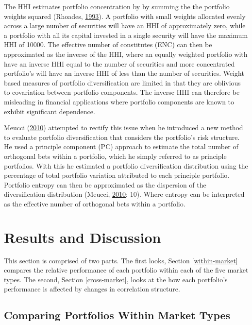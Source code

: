 \documentclass[11pt,preprint, authoryear]{elsarticle}
\numberwithin{equation}{section}
\numberwithin{figure}{section}
\numberwithin{table}{section}
\begin{document}
The HHI estimates portfolio concentration by by summing the the
portfolio weights squared (Rhoades,
\protect\hyperlink{ref-rhoades1993}{1993}). A portfolio with small
weights allocated evenly across a large number of securities will have
an HHI of approximately zero, while a portfolio with all its capital
invested in a single security will have the maximum HHI of 10000. The
effective number of constitutes (ENC) can then be approximated as the
inverse of the HHI, where an equally weighted portfolio with have an
inverse HHI equal to the number of securities and more concentrated
portfolio's will have an inverse HHI of less than the number of
securities. Weight based measures of portfolio diversification are
limited in that they are oblivious to covariation between portfolio
components. The inverse HHI can therefore be misleading in financial
applications where portfolio components are known to exhibit significant
dependence.

Meucci (\protect\hyperlink{ref-meucci2010}{2010}) attempted to rectify
this issue when he introduced a new method to evaluate portfolio
diversification that considers the portfolio's risk structure. He used a
principle component (PC) approach to estimate the total number of
orthogonal bets within a portfolio, which he simply referred to as
principle portfolios. With this he estimated a portfolio diversification
distribution using the percentage of total portfolio variation
attributed to each principle portfolio. Portfolio entropy can then be
approximated as the dispersion of the diversification distribution
(Meucci, \protect\hyperlink{ref-meucci2010}{2010}: 10). Where entropy
can be interpreted as the effective number of orthogonal bets within a
portfolio.

\hypertarget{results-and-discussion}{%
\section{\texorpdfstring{Results and Discussion
\label{reasults}}{Results and Discussion }}\label{results-and-discussion}}

This section is comprised of two parts. The first looks, Section
\ref{within-market} compares the relative performance of each portfolio
within each of the five market types. The second, Section
\ref{cross-market}, looks at the how each portfolio's performance is
affected by changes in correlation structure.

\hypertarget{comparing-portfolios-within-market-types}{%
\subsection{\texorpdfstring{Comparing Portfolios Within Market Types
\label{within-market}}{Comparing Portfolios Within Market Types }}\label{comparing-portfolios-within-market-types}}
\end{document}
